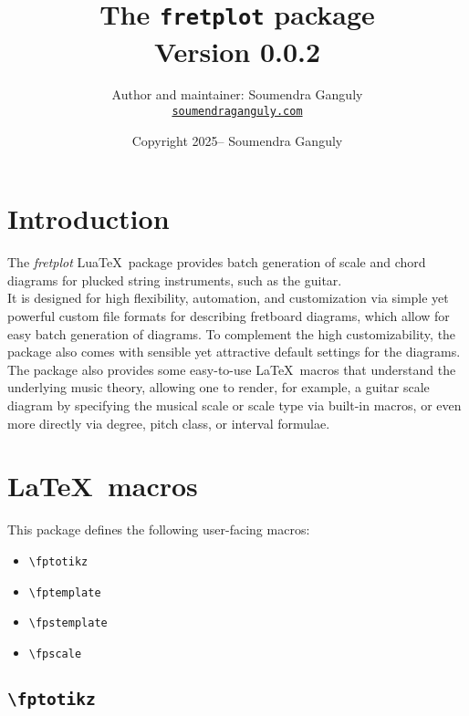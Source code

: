 \documentclass[12pt,letterpaper]{article}
\title{The \texttt{fretplot} package\\\large Version 0.0.2}
\author{Author and maintainer: Soumendra Ganguly\\\href{https://soumendraganguly.com}{\texttt{soumendraganguly.com}}}
\date{Copyright 2025-- Soumendra Ganguly}
\begin{document}
\maketitle
\thispagestyle{empty}
\tableofcontents

\newpage

\section{Introduction}

The \textit{fretplot} Lua\TeX\ package provides batch generation of scale and chord diagrams for plucked string instruments, such as the guitar.\\

It is designed for high flexibility, automation, and customization via simple yet powerful custom file formats for describing fretboard diagrams, which allow for easy batch generation of diagrams. To complement the high customizability, the package also comes with sensible yet attractive default settings for the diagrams.\\

The package also provides some easy-to-use \LaTeX\ macros that understand the underlying music theory, allowing one to render, for example, a guitar scale diagram by specifying the musical scale or scale type via built-in macros, or even more directly via degree, pitch class, or interval formulae.

\newpage

\section{\LaTeX\ macros}

This package defines the following user-facing macros:

\begin{itemize}
  \item \verb|\fptotikz|
  \item \verb|\fptemplate|
  \item \verb|\fpstemplate|
  \item \verb|\fpscale|
\end{itemize}

\subsection{\texttt{\textbackslash fptotikz}}
\end{document}
